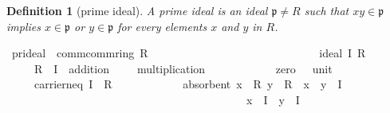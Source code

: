 \documentclass[12pt]{scrartcl}
\newtheorem{definition}[proposition]{Definition}
\begin{document}
\begin{definition}[prime ideal]
	A prime ideal is an ideal $\mathfrak{p} \neq R$ such that $x y \in \mathfrak{p}$ implies $x \in \mathfrak{p}$ or $y \in \mathfrak{p}$ for every elements $x$ and $y$ in $R$.
\end{definition}

\begin{isabelle}
\isamarkupfalse%
\ pr{\isacharunderscore}{\kern0pt}ideal\ {\isacharequal}{\kern0pt}\ comm{\isacharcolon}{\kern0pt}comm{\isacharunderscore}{\kern0pt}ring\ R\ {\isachardoublequoteopen}{\isacharparenleft}{\kern0pt}{\isacharplus}{\kern0pt}{\isacharparenright}{\kern0pt}{\isachardoublequoteclose}\ {\isachardoublequoteopen}{\isacharparenleft}{\kern0pt}{\isasymcdot}{\isacharparenright}{\kern0pt}{\isachardoublequoteclose}\ {\isachardoublequoteopen}{\isasymzero}{\isachardoublequoteclose}\ {\isachardoublequoteopen}{\isasymone}{\isachardoublequoteclose}\ \isanewline
\ \ \ \ \ \ \ \ \ \ \ \ \ \ \ \ \ \ \ \ \ \ \ \ {\isacharplus}{\kern0pt}\ ideal\ I\ R\ {\isachardoublequoteopen}{\isacharparenleft}{\kern0pt}{\isacharplus}{\kern0pt}{\isacharparenright}{\kern0pt}{\isachardoublequoteclose}\ {\isachardoublequoteopen}{\isacharparenleft}{\kern0pt}{\isasymcdot}{\isacharparenright}{\kern0pt}{\isachardoublequoteclose}\ {\isachardoublequoteopen}{\isasymzero}{\isachardoublequoteclose}\ {\isachardoublequoteopen}{\isasymone}{\isachardoublequoteclose}\isanewline
\ \ \ \ \ R\ \ I\ \ addition\ {\isacharparenleft}{\kern0pt}\ {\isachardoublequoteopen}{\isacharplus}{\kern0pt}{\isachardoublequoteclose}\ {}{}{\isacharparenright}{\kern0pt}\ \ multiplication\ \isanewline
\ \ \ \ \ \ \ {\isacharparenleft}{\kern0pt}\ {\isachardoublequoteopen}{\isasymcdot}{\isachardoublequoteclose}\ {}{}{\isacharparenright}{\kern0pt}\ \ zero\ {\isacharparenleft}{\kern0pt}{\isachardoublequoteopen}{\isasymzero}{\isachardoublequoteclose}{\isacharparenright}{\kern0pt}\ \ unit\ {\isacharparenleft}{\kern0pt}{\isachardoublequoteopen}{\isasymone}{\isachardoublequoteclose}{\isacharparenright}{\kern0pt}\isanewline
\ \ \ {\isacharplus}{\kern0pt}\ \ carrier{\isacharunderscore}{\kern0pt}neq{\isacharcolon}{\kern0pt}\ {\isachardoublequoteopen}I\ {\isasymnoteq}\ R{\isachardoublequoteclose}\ \isanewline
\ \ \ \ \ \ \ \ \ \ \ absorbent{\isacharcolon}{\kern0pt}\ {\isachardoublequoteopen}{\isasymlbrakk}x\ {\isasymin}\ R{\isacharsemicolon}{\kern0pt}\ y\ {\isasymin}\ R{\isasymrbrakk}\ {\isasymLongrightarrow}\ {\isacharparenleft}{\kern0pt}x\ {\isasymcdot}\ y\ {\isasymin}\ I{\isacharparenright}{\kern0pt}\ \isanewline
\ \ \ \ \ \ \ \ \ \ \ \ \ \ \ \ \ \ \ \ \ \ \ \ \ \ \ \ \ \ \ \ \ \ \ \ \ \ \ \ \ \ {\isasymLongrightarrow}\ {\isacharparenleft}{\kern0pt}x\ {\isasymin}\ I\ {\isasymor}\ y\ {\isasymin}\ I{\isacharparenright}{\kern0pt}{\isachardoublequoteclose}
\end{isabelle}
\end{document}
